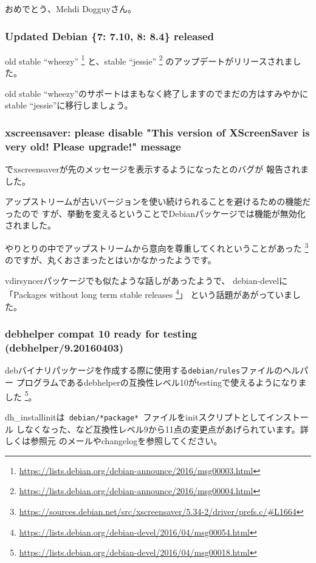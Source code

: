 \documentclass[mingoth,a4paper]{jsarticle}
\begin{document}
おめでとう、Mehdi Dogguyさん。

\subsubsection{Updated Debian \{7: 7.10, 8: 8.4\} released}

old stable ``wheezy''%
\footnote{\url{https://lists.debian.org/debian-announce/2016/msg00003.html}}
と、stable ``jessie''%
\footnote{\url{https://lists.debian.org/debian-announce/2016/msg00004.html}}
のアップデートがリリースされました。

old stable ``wheezy''のサポートはまもなく終了しますのでまだの方はすみやかに
stable ``jessie''に移行しましょう。

\subsubsection {xscreensaver: please disable "This version of XScreenSaver is very old! Please upgrade!" message}

でxscreensaverが先のメッセージを表示するようになったとのバグが
報告されました。

アップストリームが古いバージョンを使い続けられることを避けるための機能だったので
すが、挙動を変えるということでDebianパッケージでは機能が無効化されました。

やりとりの中でアップストリームから意向を尊重してくれということがあった%
\footnote{\url{https://sources.debian.net/src/xscreensaver/5.34-2/driver/prefs.c/\#L1664}}
のですが、丸くおさまったとはいかなかったようです。

vdirsyncerパッケージでも似たような話しがあったようで、
debian-develに「Packages without long term stable releases%
\footnote{\url{https://lists.debian.org/debian-devel/2016/04/msg00054.html}}」
という話題があがっていました。

\subsubsection{debhelper compat 10 ready for testing (debhelper/9.20160403)}

debバイナリパッケージを作成する際に使用する\texttt{debian/rules}ファイルのヘルパー
プログラムであるdebhelperの互換性レベル10がtestingで使えるようになりました%
\footnote{\url{https://lists.debian.org/debian-devel/2016/04/msg00018.html}}。

dh\_installinitは\texttt{ debian/*package* }ファイルをinitスクリプトとしてインストール
しなくなった、など互換性レベル9から11点の変更点があげられています。詳しくは参照元
のメールやchangelogを参照してください。
\end{document}
